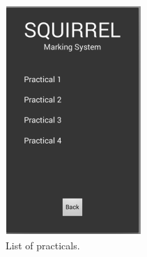 \documentclass[11pt,a4paper]{article}
\begin{document}
		\begin{figure}[h]
		\centering
		\includegraphics[width=0.7\linewidth]{./mobile_practicalsView}
		\caption{List of practicals.}
		\label{fig:mobile_practicalsView}
		\end{figure}
\end{document}
